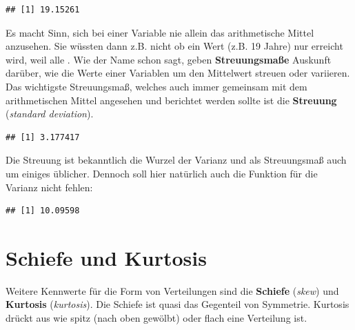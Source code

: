 \documentclass[
]{book}
\newenvironment{Shaded}{\begin{snugshade}}{\end{snugshade}}
\newcommand{\AttributeTok}[1]{\textcolor[rgb]{0.77,0.63,0.00}{#1}}
\newcommand{\ConstantTok}[1]{\textcolor[rgb]{0.00,0.00,0.00}{#1}}
\newcommand{\FunctionTok}[1]{\textcolor[rgb]{0.00,0.00,0.00}{#1}}
\newcommand{\NormalTok}[1]{#1}
\newcommand{\SpecialCharTok}[1]{\textcolor[rgb]{0.00,0.00,0.00}{#1}}
\begin{document}
\begin{verbatim}
## [1] 19.15261
\end{verbatim}

Es macht Sinn, sich bei einer Variable nie allein das arithmetische Mittel anzusehen. Sie wüssten dann z.B. nicht ob ein Wert (z.B. 19 Jahre) nur erreicht wird, weil alle . Wie der Name schon sagt, geben \textbf{Streuungsmaße} Auskunft darüber, wie die Werte einer Variablen um den Mittelwert streuen oder variieren. Das wichtigste Streuungsmaß, welches auch immer gemeinsam mit dem arithmetischen Mittel angesehen und berichtet werden sollte ist die \textbf{Streuung} (\emph{standard deviation}).

\begin{Shaded}
\end{Shaded}

\begin{verbatim}
## [1] 3.177417
\end{verbatim}

Die Streuung ist bekanntlich die Wurzel der Varianz und als Streuungsmaß auch um einiges üblicher. Dennoch soll hier natürlich auch die Funktion für die Varianz nicht fehlen:

\begin{Shaded}
\end{Shaded}

\begin{verbatim}
## [1] 10.09598
\end{verbatim}

\hypertarget{schiefe-und-kurtosis}{%
\section{Schiefe und Kurtosis}\label{schiefe-und-kurtosis}}

Weitere Kennwerte für die Form von Verteilungen sind die \textbf{Schiefe} (\emph{skew}) und \textbf{Kurtosis} (\emph{kurtosis}). Die Schiefe ist quasi das Gegenteil von Symmetrie. Kurtosis drückt aus wie spitz (nach oben gewölbt) oder flach eine Verteilung ist.
\end{document}
